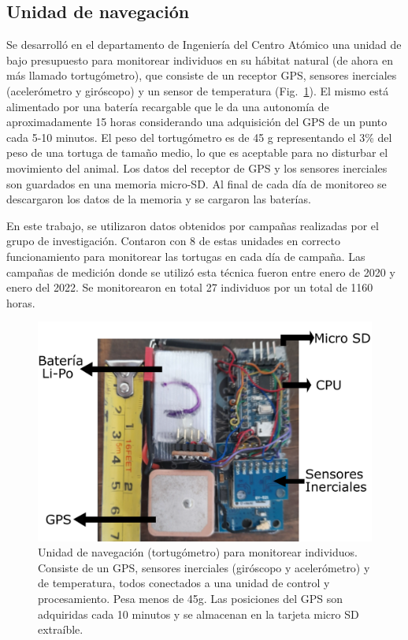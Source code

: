 \subsection{Unidad de navegación}
Se desarrolló en el departamento de Ingeniería del Centro Atómico  una unidad de bajo presupuesto para monitorear individuos en su hábitat natural (de ahora en más llamado tortugómetro), que consiste de un receptor GPS, sensores inerciales (acelerómetro y giróscopo) y un sensor de temperatura (Fig.~\ref{fig:tortugometro}). El mismo está alimentado por una batería recargable que le da una autonomía de aproximadamente 15 horas considerando una adquisición del GPS de un punto cada 5-10 minutos. El peso del tortugómetro es de 45 g representando el 3\% del peso de una tortuga de tamaño medio, lo que es aceptable para no disturbar el movimiento del animal. Los datos del receptor de GPS y los sensores inerciales son guardados en una memoria micro-SD. Al final de cada día de monitoreo se descargaron los datos de la memoria y se cargaron las baterías. 
 
En este trabajo, se utilizaron datos obtenidos por campañas realizadas por el grupo de investigación. Contaron con 8 de estas unidades en correcto funcionamiento para monitorear las tortugas en cada día de campaña. Las campañas de medición donde se utilizó esta técnica fueron entre enero de 2020 y enero del 2022. Se monitorearon en total 27 individuos por un total de 1160 horas.
\begin{figure}[ht]
    \begin{center}
        
    
    \includegraphics[width=\imsize]{figs/Chap1/tortugometro.pdf}  
\end{center}
    \caption[Unidad de navegación (tortugómetro) para monitorear individuos.] {Unidad de navegación (tortugómetro) para monitorear individuos. Consiste de un GPS, sensores inerciales (giróscopo y acelerómetro) y de temperatura, todos conectados a una unidad de control y procesamiento. Pesa menos de 45g. Las posiciones del GPS son adquiridas cada 10 minutos y se almacenan en la tarjeta micro SD extraíble. }
    \label{fig:tortugometro}
\end{figure}

